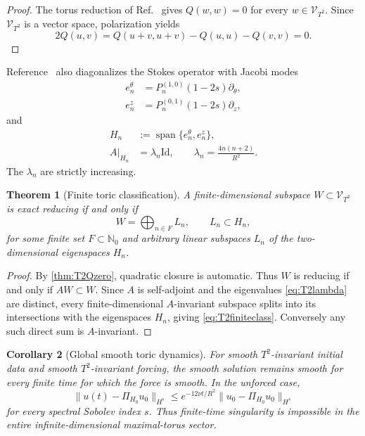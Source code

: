 \documentclass[
 aps,
 prd,
 reprint,
 amsmath,
 amssymb,
 nofootinbib,
 superscriptaddress
]{revtex4-2}
\newtheorem{theorem}{Theorem}[section]
\newtheorem{corollary}[theorem]{Corollary}
\theoremstyle{definition}
\theoremstyle{remark}
\newcommand{\cV}{\mathcal V}
\newcommand{\Id}{\mathrm{Id}}
\begin{document}
\begin{proof}
The torus reduction of Ref.~\cite{PreeceBatenin2026} gives $Q(w,w)=0$ for every
$w\in\cV_{T^2}$.  Since $\cV_{T^2}$ is a vector space, polarization yields
\[
 2Q(u,v)=Q(u+v,u+v)-Q(u,u)-Q(v,v)=0.
\]
\end{proof}

Reference~\cite{PreeceBatenin2026} also diagonalizes the Stokes operator with Jacobi modes
\begin{align}
 e_n^\theta&=P_n^{(1,0)}(1-2s)\partial_\theta,\\
 e_n^z&=P_n^{(0,1)}(1-2s)\partial_z,
\end{align}
and
\begin{equation}
\begin{aligned}
 H_n&:=\operatorname{span}\{e_n^\theta,e_n^z\},\\
 A|_{H_n}&=\lambda_n\Id,
 \qquad
 \lambda_n=\frac{4n(n+2)}{R^2}.
\end{aligned}
\label{eq:T2lambda}
\end{equation}
The $\lambda_n$ are strictly increasing.

\begin{theorem}[Finite toric classification]
\label{thm:T2class}
A finite-dimensional subspace $W\subset\cV_{T^2}$ is exact reducing if and
only if
\begin{equation}
 \boxed{
 W=\bigoplus_{n\in F}L_n,
 \qquad
 L_n\subset H_n,
 }
 \label{eq:T2finiteclass}
\end{equation}
for some finite set $F\subset\mathbb N_0$ and arbitrary linear subspaces
$L_n$ of the two-dimensional eigenspaces $H_n$.
\end{theorem}

\begin{proof}
By \cref{thm:T2Qzero}, quadratic closure is automatic.  Thus $W$ is reducing
if and only if $AW\subset W$.  Since $A$ is self-adjoint and the eigenvalues
\eqref{eq:T2lambda} are distinct, every finite-dimensional $A$-invariant
subspace splits into its intersections with the eigenspaces $H_n$, giving
\eqref{eq:T2finiteclass}.  Conversely any such direct sum is $A$-invariant.
\end{proof}

\begin{corollary}[Global smooth toric dynamics]
For smooth $T^2$-invariant initial data and smooth $T^2$-invariant forcing,
the smooth solution remains smooth for every finite time for which the force
is smooth.  In the unforced case,
\begin{equation}
 \|u(t)-\Pi_{H_0}u_0\|_{H^s}
 \le
 e^{-12\nu t/R^2}
 \|u_0-\Pi_{H_0}u_0\|_{H^s}
 \label{eq:T2decay}
\end{equation}
for every spectral Sobolev index $s$.  Thus finite-time singularity is
impossible in the entire infinite-dimensional maximal-torus sector.
\end{corollary}
\end{document}

